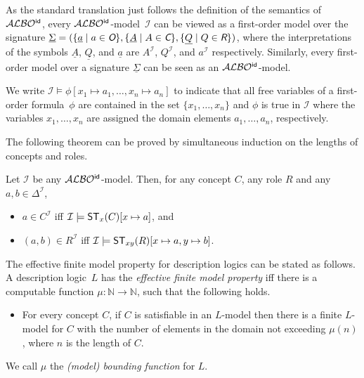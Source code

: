 \documentclass[leqno
,pdflatex
,prodmode
,acmtocl
]{acmsmall}
\newcommand{\mathcmd}[1]{\ensuremath{#1}\xspace}
\newcommand{\dlfont}{\mathcal}
\newcommand{\dl}[1]{\mathcmd{\dlfont{#1}}}
\newcommand{\idRole}{\mathcmd{\textsf{\upshape\mdseries id}}}
\newcommand{\ALBOid}{\dl{ALBO\smash[t]{\mbox{${}^{\idRole}$}}}}
\newcommand{\N}{\mathbb{N}}
\newcommand{\indiv}{a}
\newcommand{\cname}{A}
\newcommand{\rname}{Q}
\newcommand{\Objects}{\textsf{\slshape O}\xspace\/}
\newcommand{\Concepts}{\textsf{\slshape C}\xspace\/}
\newcommand{\Roles}{\textsf{\slshape R}\xspace\/}
\newcommand{\I}{\mathcal{I}}
\newcommand{\ST}{\mathcmd{\textsf{\upshape ST}}}
\begin{document}
As the standard translation just follows the definition of the semantics
of \ALBOid, every \ALBOid-model~$\I$ can be viewed as a first-order model
over the signature $\underline{\Sigma}=(\{\underline{\indiv}\mid\indiv\in\Objects\},
                                       \{\underline{\cname}\mid \cname\in\Concepts\},
                                       \{\underline{\rname}\mid \rname\in\Roles\})$,
where the interpretations of the symbols
$\underline{\cname}$, $\underline{\rname}$, and $\underline{\indiv}$
are $\cname^\I$, $\rname^\I$, and $\indiv^\I$ respectively.
Similarly, every first-order model over a signature $\underline{\Sigma}$
can be seen as an \ALBOid-model.

We write $\I\models\phi[x_1\mapsto a_1,\ldots,x_n\mapsto a_n]$
to indicate that all free variables of 
a first-order formula~$\phi$ 
are contained in the set $\{x_1,\ldots,x_n\}$
and $\phi$ is true in $\I$ where the variables 
$x_1,\ldots,x_n$ are assigned the domain elements $a_1,\ldots,a_n$, respectively.

The following theorem can be proved by simultaneous induction on the
lengths of concepts and roles.
\begin{theorem}\label{theorem: embedding into FO2}
Let $\I$ be any \ALBOid-model. Then, for any concept $C$, any role $R$ and any $a,b\in\Delta^\I$,
\begin{itemize}
 \item $a\in C^\I$ iff $\I\models\ST_x(C)[x\mapsto a]$, and
 \item $(a,b)\in R^\I$ iff $\I\models\ST_{xy}(R)[x\mapsto a,y\mapsto
b]$.
\end{itemize}
\end{theorem}

The effective finite model property
 for description logics can be stated as follows.
 A description logic~$L$ has the \emph{effective finite model property} iff
 there is a computable 
 function $\mu:\N\to\N$,
 such that the following holds.
    \begin{itemize}
     \setlength{\topskip}{0pt}
     \setlength{\itemsep}{0pt}
     \setlength{\itemindent}{0pt}
     \item[]
           For every concept $C$,  
           if $C$ is satisfiable in an $L$-model
           then there is a finite $L$-model for $C$ 
           with the number of elements in the domain not exceeding $\mu(n)$,
           where $n$ is the length of $C$. \end{itemize}
We call $\mu$ the \emph{(model) bounding function} for $L$.
 
\end{document}
